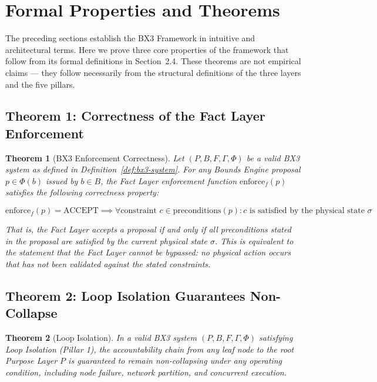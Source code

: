 \documentclass[12pt]{article}
\theoremstyle{plain}
\newtheorem{thrm}{Theorem}[section]
\begin{document}
\section{Formal Properties and Theorems}\label{sec:theorems}

The preceding sections establish the BX3 Framework in intuitive and architectural terms. Here we prove three core properties of the framework that follow from its formal definitions in Section~2.4. These theorems are not empirical claims --- they follow necessarily from the structural definitions of the three layers and the five pillars.

\subsection{Theorem 1: Correctness of the Fact Layer Enforcement}\label{thrm:correctness}

\begin{thrm}[BX3 Enforcement Correctness]\label{thrm:bounds-enforcement}
Let $(P, B, F, \Gamma, \Phi)$ be a valid BX3 system as defined in Definition~\ref{def:bx3-system}. For any Bounds Engine proposal $p \in \Phi(b)$ issued by $b \in B$, the Fact Layer enforcement function $\text{enforce}_f(p)$ satisfies the following correctness property:

\[
\text{enforce}_f(p) = \text{ACCEPT} \implies \forall \text{constraint } c \in \text{preconditions}(p) : c \text{ is satisfied by the physical state } \sigma
\]

That is, the Fact Layer accepts a proposal \textit{if and only if} all preconditions stated in the proposal are satisfied by the current physical state $\sigma$. This is equivalent to the statement that the Fact Layer \textit{cannot be bypassed}: no physical action occurs that has not been validated against the stated constraints.
\end{thrm}

\subsection{Theorem 2: Loop Isolation Guarantees Non-Collapse}\label{thrm:loop-isolation}

\begin{thrm}[Loop Isolation]\label{thrm:loop-isolate}
In a valid BX3 system $(P, B, F, \Gamma, \Phi)$ satisfying Loop Isolation (Pillar 1), the accountability chain from any leaf node to the root Purpose Layer $P$ is guaranteed to remain non-collapsing under any operating condition, including node failure, network partition, and concurrent execution.
\end{thrm}
\end{document}
